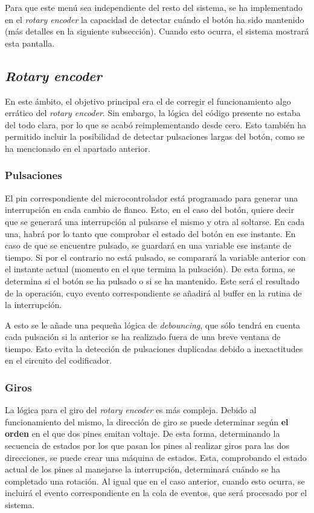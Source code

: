 Para que este menú sea independiente del resto del sistema, se ha implementado en el \textit{rotary encoder} la capacidad de detectar cuándo el botón ha sido mantenido (más detalles en la siguiente subsección). Cuando esto ocurra, el sistema mostrará esta pantalla.

\subsection{\textit{Rotary encoder}}

En este ámbito, el objetivo principal era el de corregir el funcionamiento algo errático del \textit{rotary encoder}. Sin embargo, la lógica del código presente no estaba del todo clara, por lo que se acabó reimplementando desde cero. Esto también ha permitido incluir la posibilidad de detectar pulsaciones largas del botón, como se ha mencionado en el apartado anterior.

\subsubsection{Pulsaciones}

El pin correspondiente del microcontrolador está programado para generar una interrupción en cada cambio de flanco. Esto, en el caso del botón, quiere decir que se generará una interrupción al pulsarse el mismo y otra al soltarse. En cada una, habrá por lo tanto que comprobar el estado del botón en ese instante. En caso de que se encuentre pulsado, se guardará en una variable ese instante de tiempo. Si por el contrario no está pulsado, se comparará la variable anterior con el instante actual (momento en el que termina la pulsación). De esta forma, se determina si el botón se ha pulsado o si se ha mantenido. Este será el resultado de la operación, cuyo evento correspondiente se añadirá al buffer en la rutina de la interrupción.

A esto se le añade una pequeña lógica de \textit{debouncing}, que sólo tendrá en cuenta cada pulsación si la anterior se ha realizado fuera de una breve ventana de tiempo. Esto evita la detección de pulsaciones duplicadas debido a inexactitudes en el circuito del codificador.

\subsubsection{Giros}

La lógica para el giro del \textit{rotary encoder} es más compleja. Debido al funcionamiento del mismo, la dirección de giro se puede determinar según \textbf{el orden} en el que dos pines emitan voltaje. De esta forma, determinando la secuencia de estados por los que pasan los pines al realizar giros para las dos direcciones, se puede crear una máquina de estados. Esta, comprobando el estado actual de los pines al manejarse la interrupción, determinará cuándo se ha completado una rotación. Al igual que en el caso anterior, cuando esto ocurra, se incluirá el evento correspondiente en la cola de eventos, que será procesado por el sistema.

